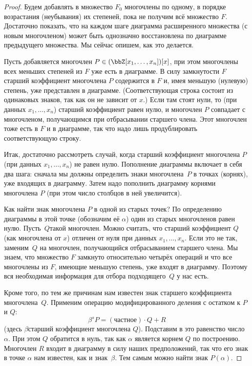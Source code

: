 \begin{proof}
Будем добавлять в множество $F_0$ многочлены по одному, в
порядке возрастания (неубывания)
их степеней, пока не получим всё множество
$F$. Достаточно показать, что на каждом шаге диаграмма
расширенного множества (с новым многочленом) может быть
однозначно восстановлена по диаграмме предыдущего множества. Мы
сейчас опишем, как это делается.

Пусть добавляется многочлен $P\hm\in(\bbZ[x_1,\dots,x_n])[x]$,
при этом многочлены всех меньших степеней из $F$ уже есть в
диаграмме. В силу замкнутости $F$ старший коэффициент многочлена
$P$ содержится в $F$ и, имея меньшую (нулевую)
степень, уже представлен в
диаграмме. (Соответствующая строка состоит из одинаковых знаков,
так как он не зависит от $x$.) Если там стоят нули, то (при
данных $x_1,\dots,x_n$) старший коэффициент равен нулю, и
многочлен $P$ совпадает с многочленом, получающимся при
отбрасывании старшего члена. Этот многочлен тоже есть в $F$ и в
диаграмме, так что надо лишь продублировать соответствующую
строку.

Итак, достаточно рассмотреть случай, когда старший коэффициент
многочлена $P$ (при данных $x_1,\dots,x_n$) не равен нулю.
Пополнение диаграммы включает в себя два шага: сначала мы должны
определить знаки многочлена~$P$ в точках (корнях), уже входящих в
диаграмму. Затем надо пополнить диаграмму корнями многочлена $P$
(при этом число столбцов в ней увеличится).

Как найти знак многочлена $P$ в одной из старых точек? По
определению диаграммы в этой точке (обозначим её $\alpha$) один
из старых многочленов равен нулю. Пусть~$Q$\т такой многочлен.
Можно считать, что старший коэффициент $Q$ (как многочлена от
$x$) отличен от нуля при данных $x_1,\dots,x_n$.
Если это не так, заменим~$Q$ на многочлен,
получающийся отбрасыванием старшего члена. Мы знаем, что
множество $F$ замкнуто относительно четырёх операций и что все
многочлены из $F$, имеющие меньшую степень, уже входят в
диаграмму. Поэтому вся необходимая информация для отбора
подходящего~$Q$ у нас есть.

Кроме того, по тем же причинам нам известен знак старшего
коэффициента многочлена~$Q$. Применим операцию модифицированного
деления с остатком к $P$ и $Q$:
        $$
\beta^s P = (\text{частное})\cdot Q + R
        $$
(здесь $\beta$\т старший коэффициент многочлена $Q$). Подставим
в это равенство число $\alpha$. При этом $Q$ обратится в нуль,
так как $\alpha$ является корнем $Q$ по построению. Многочлен
$R$ входит в диаграмму в силу наших предположений, так что его
знак в точке $\alpha$ нам известен, как и знак~$\beta$. Тем
самым можно найти знак $P(\alpha)$.


\end{proof}
